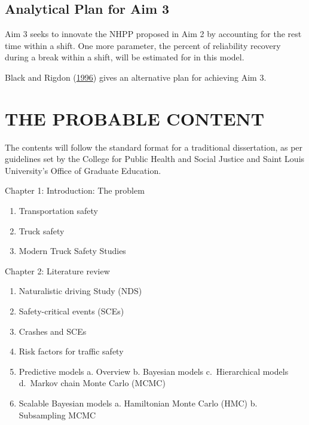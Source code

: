 \documentclass[12pt]{book}
\numberwithin{equation}{chapter}
\providecommand{\tightlist}{%
  \setlength{\itemsep}{0pt}\setlength{\parskip}{0pt}}
\begin{document}
\hypertarget{analytical-plan-for-aim-3}{%
\section{Analytical Plan for Aim 3}\label{analytical-plan-for-aim-3}}

Aim 3 seeks to innovate the NHPP proposed in Aim 2 by accounting for the rest time within a shift. One more parameter, the percent of reliability recovery during a break within a shift, will be estimated for in this model.

Black and Rigdon (\protect\hyperlink{ref-black1996statistical}{1996}) gives an alternative plan for achieving Aim 3.

\hypertarget{the-probable-content}{%
\chapter{THE PROBABLE CONTENT}\label{the-probable-content}}

The contents will follow the standard format for a traditional dissertation, as per guidelines set by the College for Public Health and Social Justice and Saint Louis University's Office of Graduate Education.

Chapter 1: Introduction: The problem

\begin{enumerate}
\def\labelenumi{\arabic{enumi}.}
\tightlist
\item
  Transportation safety
\item
  Truck safety
\item
  Modern Truck Safety Studies
\end{enumerate}

Chapter 2: Literature review

\begin{enumerate}
\def\labelenumi{\arabic{enumi}.}
\tightlist
\item
  Naturalistic driving Study (NDS)
\item
  Safety-critical events (SCEs)
\item
  Crashes and SCEs
\item
  Risk factors for traffic safety
\item
  Predictive models
  a. Overview
  b. Bayesian models
  c.~Hierarchical models
  d.~Markov chain Monte Carlo (MCMC)
\item
  Scalable Bayesian models
  a. Hamiltonian Monte Carlo (HMC)
  b. Subsampling MCMC
\end{enumerate}
\end{document}
